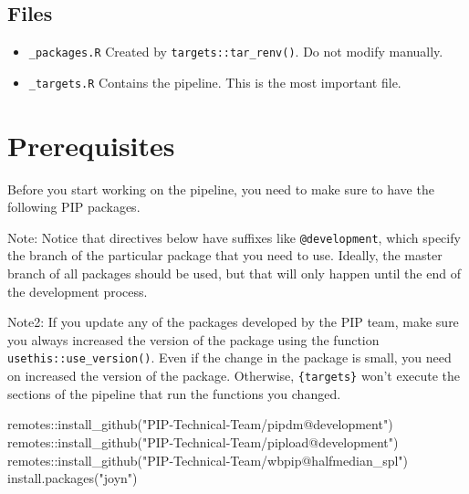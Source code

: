 \documentclass[
]{book}
\newenvironment{Shaded}{\begin{snugshade}}{\end{snugshade}}
\newcommand{\FunctionTok}[1]{\textcolor[rgb]{0.00,0.00,0.00}{#1}}
\newcommand{\NormalTok}[1]{#1}
\newcommand{\SpecialCharTok}[1]{\textcolor[rgb]{0.00,0.00,0.00}{#1}}
\newcommand{\StringTok}[1]{\textcolor[rgb]{0.31,0.60,0.02}{#1}}
\begin{document}
\hypertarget{files}{%
\subsection*{Files}\label{files}}

\begin{itemize}
\item
  \texttt{\_packages.R} Created by \texttt{targets::tar\_renv()}. Do not modify manually.
\item
  \texttt{\_targets.R} Contains the pipeline. This is the most important file.
\end{itemize}

\hypertarget{prerequisites-1}{%
\section{Prerequisites}\label{prerequisites-1}}

Before you start working on the pipeline, you need to make sure to have the
following PIP packages.

{Note:} Notice that directives below have suffixes like
\texttt{@development}, which specify the branch of the particular package that you need
to use. Ideally, the master branch of all packages should be used, but that will
only happen until the end of the development process.

{Note2:} If you update any of the packages developed by the
PIP team, make sure you always increased the version of the package using the
function \texttt{usethis::use\_version()}. Even if the change in the package is small,
you need on increased the version of the package. Otherwise, \texttt{\{targets\}} won't
execute the sections of the pipeline that run the functions you changed.

\begin{Shaded}
\begin{Highlighting}[]
\NormalTok{remotes}\SpecialCharTok{::}\FunctionTok{install\_github}\NormalTok{(}\StringTok{"PIP{-}Technical{-}Team/pipdm@development"}\NormalTok{)}
\NormalTok{remotes}\SpecialCharTok{::}\FunctionTok{install\_github}\NormalTok{(}\StringTok{"PIP{-}Technical{-}Team/pipload@development"}\NormalTok{)}
\NormalTok{remotes}\SpecialCharTok{::}\FunctionTok{install\_github}\NormalTok{(}\StringTok{"PIP{-}Technical{-}Team/wbpip@halfmedian\_spl"}\NormalTok{)}
\FunctionTok{install.packages}\NormalTok{(}\StringTok{"joyn"}\NormalTok{)}
\end{Highlighting}
\end{Shaded}
\end{document}
